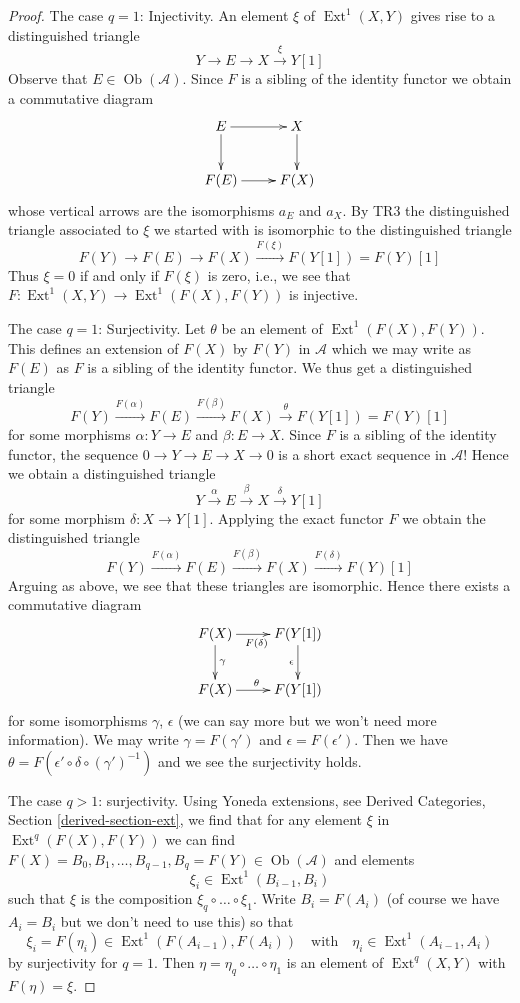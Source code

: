 \documentclass{stacks-project}
\theoremstyle{plain}
\theoremstyle{definition}
\theoremstyle{remark}
\numberwithin{equation}{subsection}
\def\Ext{\mathop{\mathrm{Ext}}\nolimits}
\def\Ob{\mathop{\mathrm{Ob}}\nolimits}
\begin{document}
\begin{proof}
\medskip\noindent
The case $q = 1$: Injectivity. An element $\xi$ of $\Ext^1(X, Y)$
gives rise to a distinguished triangle
$$
Y \to E \to X \xrightarrow{\xi} Y[1]
$$
Observe that $E \in \Ob(\mathcal{A})$. Since $F$ is a sibling of the
identity functor we obtain a commutative diagram
$$
\xymatrix{
E \ar[d] \ar[r] & X \ar[d] \\
F(E) \ar[r] & F(X)
}
$$
whose vertical arrows are the isomorphisms $a_E$ and $a_X$.
By TR3 the distinguished triangle associated to $\xi$ we started
with is isomorphic to the distinguished triangle
$$
F(Y) \to F(E) \to F(X) \xrightarrow{F(\xi)} F(Y[1]) = F(Y)[1]
$$
Thus $\xi = 0$ if and only if $F(\xi)$ is zero, i.e., we see that
$F : \Ext^1(X, Y) \to \Ext^1(F(X), F(Y))$ is injective.

\medskip\noindent
The case $q = 1$: Surjectivity. Let $\theta$ be an element of
$\Ext^1(F(X), F(Y))$. This defines an extension of $F(X)$ by $F(Y)$
in $\mathcal{A}$ which we may write as $F(E)$
as $F$ is a sibling of the identity functor. We thus get a distinguished
triangle
$$
F(Y) \xrightarrow{F(\alpha)} F(E)
\xrightarrow{F(\beta)} F(X)
\xrightarrow{\theta} F(Y[1]) = F(Y)[1]
$$
for some morphisms $\alpha : Y \to E$ and $\beta : E \to X$.
Since $F$ is a sibling of the identity functor, the sequence
$0 \to Y \to E \to X \to 0$
is a short exact sequence in $\mathcal{A}$! Hence we obtain a
distinguished triangle
$$
Y \xrightarrow{\alpha} E \xrightarrow{\beta} X \xrightarrow{\delta} Y[1]
$$
for some morphism $\delta : X \to Y[1]$. Applying the exact functor
$F$ we obtain the distinguished triangle
$$
F(Y) \xrightarrow{F(\alpha)} F(E) \xrightarrow{F(\beta)} F(X)
\xrightarrow{F(\delta)} F(Y)[1]
$$
Arguing as above, we see that these triangles are isomorphic.
Hence there exists a commutative diagram
$$
\xymatrix{
F(X) \ar[d]^\gamma \ar[r]_{F(\delta)} & F(Y[1]) \ar[d]_\epsilon \\
F(X) \ar[r]^\theta & F(Y[1])
}
$$
for some isomorphisms $\gamma$, $\epsilon$ (we can say more but we won't
need more information). We may write $\gamma = F(\gamma')$ and
$\epsilon = F(\epsilon')$. Then we have
$\theta = F(\epsilon' \circ \delta \circ (\gamma')^{-1})$
and we see the surjectivity holds.

\medskip\noindent
The case $q > 1$: surjectivity. Using Yoneda extensions, see
Derived Categories, Section \ref{derived-section-ext}, we find that for any
element $\xi$ in $\Ext^q(F(X), F(Y))$ we can find
$F(X) = B_0, B_1, \ldots, B_{q - 1}, B_q = F(Y) \in \Ob(\mathcal{A})$ and
elements
$$
\xi_i \in \Ext^1(B_{i - 1}, B_i)
$$
such that $\xi$ is the composition $\xi_q \circ \ldots \circ \xi_1$.
Write $B_i = F(A_i)$ (of course we have $A_i = B_i$ but we don't
need to use this) so that
$$
\xi_i = F(\eta_i) \in \Ext^1(F(A_{i - 1}), F(A_i))
\quad\text{with}\quad
\eta_i \in \Ext^1(A_{i - 1}, A_i)
$$
by surjectivity for $q = 1$. Then $\eta = \eta_q \circ \ldots \circ \eta_1$
is an element of $\Ext^q(X, Y)$ with $F(\eta) = \xi$.


\end{proof}
\end{document}
